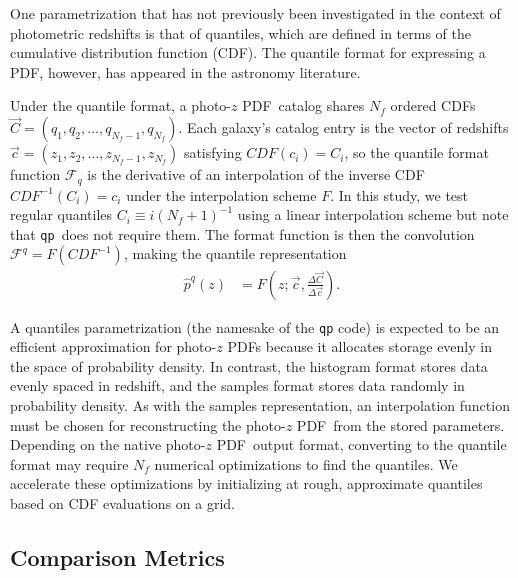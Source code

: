 \documentclass[\docopts]{\docclass}
\newcommand{\qp}{\texttt{qp}}
\newcommand{\pz}{photo-$z$ PDF}
\begin{document}
One parametrization that has not previously been investigated in the context of 
photometric redshifts is that of quantiles, which are defined in terms of the 
cumulative distribution function (CDF).
The quantile format for expressing a PDF, however, has appeared in the 
astronomy literature.  \citep{sun_star_2015, pizzocaro_results_2016, 
laycock_x-ray_2017}

Under the quantile format, a \pz\ catalog shares $N_{f}$ ordered CDFs 
$\vec{C}=(q_{1}, q_{2}, \dots, q_{N_{f}-1}, q_{N_{f}})$.
Each galaxy's catalog entry is the vector of redshifts $\vec{c}=(z_{1}, z_{2}, 
\dots, z_{N_{f}-1}, z_{N_{f}})$ satisfying $CDF(c_{i})=C_{i}$, so the quantile 
format function $\mathcal{F}_{q}$ is the derivative of an interpolation of the 
inverse CDF $CDF^{-1}(C_{i})=c_{i}$ under the interpolation scheme $F$.
In this study, we test regular quantiles $C_{i}\equiv i(N_{f}+1)^{-1}$ using a 
linear interpolation scheme but note that \qp\ does not require them.
The format function is then the convolution $\mathcal{F}^{q}=F(CDF^{-1})$, 
making the quantile representation
\begin{align}
  \label{eq:quantiles}
  \hat{p}^{q}(z) &= F(z; \vec{c}, \frac{\Delta\vec{C}}{\Delta\vec{c}}).
\end{align}


A quantiles parametrization (the namesake of the \texttt{qp} code) is expected 
to be an efficient approximation for \pz s because it allocates storage evenly 
in the space of probability density.
In contrast, the histogram format stores data evenly spaced in redshift, and 
the samples format stores data randomly in probability density.
As with the samples representation, an interpolation function must be chosen 
for reconstructing the \pz\ from the stored parameters.
Depending on the native \pz\ output format, converting to the quantile format 
may require $N_{f}$ numerical optimizations to find the quantiles.
We accelerate these optimizations by initializing at rough, approximate 
quantiles based on CDF evaluations on a grid.





\subsection{Comparison Metrics}
\label{sec:metric}
\end{document}

